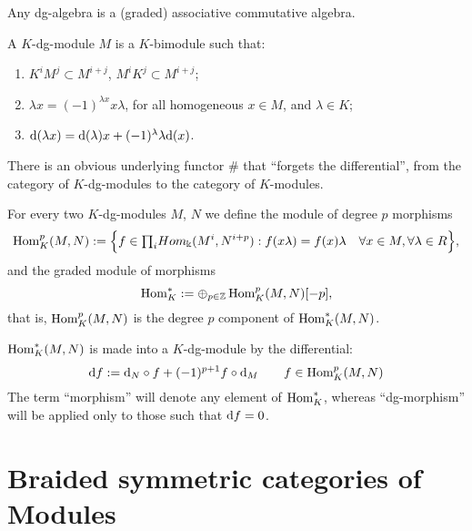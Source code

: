 Any dg-algebra is a (graded) associative commutative algebra.

\begin{definition}
  A $K$-dg-module $M$ is a $K$-bimodule such that:
  \begin{enumerate}
  \item $K^i M^j \subset M^{i+j}$, $M^i K^j \subset M^{i+j}$;
  \item $\lambda x = (-1)^{\lambda x} x\lambda$, for all homogeneous
    $x\in M$, and $\lambda\in K$;
  \item $\mathrm{d}(\lambda x) = \mathrm{d}(\lambda)x + (-1)^\lambda \lambda\mathrm{d}(x)$.
  \end{enumerate}
\end{definition}

There is an obvious underlying functor $\#$ that ``forgets the
differential'', from the category of $K$-dg-modules to the category of
$K$-modules.

\begin{definition}
  For every two $K$-dg-modules $M$, $N$ we define the module of
  degree $p$ morphisms
  \begin{equation*}
    \operatorname{Hom}_K^p (M,N) := \Bigl\{ f\in  {\textstyle \prod_i} Hom_\Bbbk (M^i, N^{i+p}) :
      f(x\lambda) = f(x)\lambda \quad \forall x\in M, \forall \lambda
      \in R \Bigr\},
  \end{equation*}
  and the graded module of morphisms
  \begin{equation*}
    \operatorname{Hom}_K^* := \oplus_{p\in\mathbb{Z}} \operatorname{Hom}_K^p (M,N)[-p],
  \end{equation*}
  that is, $\operatorname{Hom}_K^p(M,N)$ is the degree $p$ component of
  $\operatorname{Hom}_K^*(M,N)$.
\end{definition}

$\operatorname{Hom}_K^*(M,N)$ is made into a $K$-dg-module by the differential:
\begin{equation*}
  \mathrm{d} f := \mathrm{d}_N \circ f + (-1)^{p+1} f\circ \mathrm{d}_M \qquad f\in \operatorname{Hom}_K^p(M,N)
\end{equation*}
The term ``morphism'' will denote any element of $\operatorname{Hom}_K^*$, whereas
``dg-morphism'' will be applied only to those such that $\mathrm{d} f = 0$.


\section{Braided symmetric categories of Modules}
\label{sec:btc+dg}

